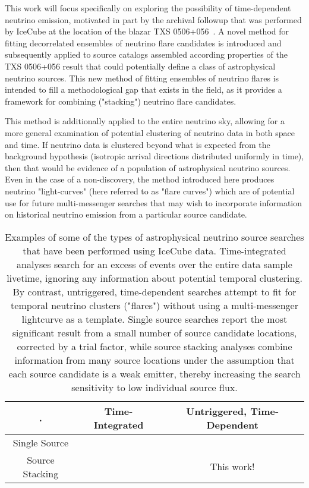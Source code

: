 This work will focus specifically on exploring the possibility of time-dependent neutrino emission, motivated in part by the archival followup that was performed by IceCube at the location of the blazar TXS 0506+056~\cite{TXS_Archival}. A novel method for fitting decorrelated ensembles of neutrino flare candidates is introduced and subsequently applied to source catalogs assembled according properties of the TXS 0506+056 result that could potentially define a class of astrophysical neutrino sources. This new method of fitting ensembles of neutrino flares is intended to fill a methodological gap that exists in the field, as it provides a framework for combining ("stacking") neutrino flare candidates. 

This method is additionally applied to the entire neutrino sky, allowing for a more general examination of potential clustering of neutrino data in both space and time. If neutrino data is clustered beyond what is expected from the background hypothesis (isotropic arrival directions distributed uniformly in time), then that would be evidence of a population of astrophysical neutrino sources. Even in the case of a non-discovery, the method introduced here produces neutrino "light-curves" (here referred to as "flare curves") which are of potential use for future multi-messenger searches that may wish to incorporate information on historical neutrino emission from a particular source candidate.  

\begin{table}[h!]
\centering
 \begin{tabular}{||c c c||} 
 \hline
 . & Time-Integrated & Untriggered, Time-Dependent\\ [0.5ex] 
 \hline\hline
 Single Source & \cite{10yr_tint} & \cite{TXS_Archival} \\ 
 \hline
 Source Stacking & \cite{2lac_ic} & This work! \\
 \hline
\end{tabular}
\caption{Examples of some of the types of astrophysical neutrino source searches that have been performed using IceCube data. Time-integrated analyses search for an excess of events over the entire data sample livetime, ignoring any information about potential temporal clustering. By contrast, untriggered, time-dependent searches attempt to fit for temporal neutrino clusters ("flares") without using a multi-messenger lightcurve as a template. Single source searches report the most significant result from a small number of source candidate locations, corrected by a trial factor, while source stacking analyses combine information from many source locations under the assumption that each source candidate is a weak emitter, thereby increasing the search sensitivity to low individual source flux. }
\label{tab:stresults}
\end{table}



